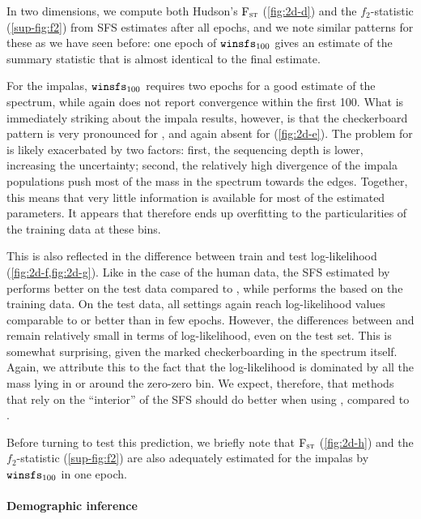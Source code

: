 In two dimensions, we compute both Hudson's $\text{F}_{\textsc{st}}$ (\cref{fig:2d-d}) and the $f_2$-statistic (\cref{sup-fig:f2}) from SFS estimates after all epochs, and we note similar patterns for these as we have seen before:
one epoch of $\winsfs[100]$ gives an estimate of the summary statistic that is almost identical to the final \realsfs estimate.

For the impalas, $\winsfs[100]$ requires two epochs for a good estimate of the spectrum, while \realsfs again does not report convergence within the first \num{100}.
What is immediately striking about the impala results, however, is that the checkerboard pattern is very pronounced for \realsfs, and again absent for \winsfs (\cref{fig:2d-e}).
The problem for \realsfs is likely exacerbated by two factors:
first, the sequencing depth is lower, increasing the uncertainty;
second, the relatively high divergence of the impala populations push most of the mass in the spectrum towards the edges.
Together, this means that very little information is available for most of the estimated parameters. 
It appears that \realsfs therefore ends up overfitting to the particularities of the training data at these bins.

This is also reflected in the difference between train and test log-likelihood (\cref{fig:2d-f,fig:2d-g}). 
Like in the case of the human data, the SFS estimated by \winsfs performs better on the test data compared to \realsfs, while \realsfs performs the based on the training data.
On the test data, all \winsfs settings again reach log-likelihood values comparable to or better than \realsfs in few epochs.
However, the differences between \realsfs and \winsfs remain relatively small in terms of log-likelihood, even on the test set.
This is somewhat surprising, given the marked checkerboarding in the spectrum itself.
Again, we attribute this to the fact that the log-likelihood is dominated by all the mass lying in or around the zero-zero bin.
We expect, therefore, that methods that rely on the \enquote{interior} of the SFS should do better when using \winsfs, compared to \realsfs.

Before turning to test this prediction, we briefly note that $\text{F}_{\textsc{st}}$ (\cref{fig:2d-h}) and the $f_2$-statistic (\cref{sup-fig:f2}) are also adequately estimated for the impalas by $\winsfs[100]$ in one epoch.

\paragraph{Demographic inference}

